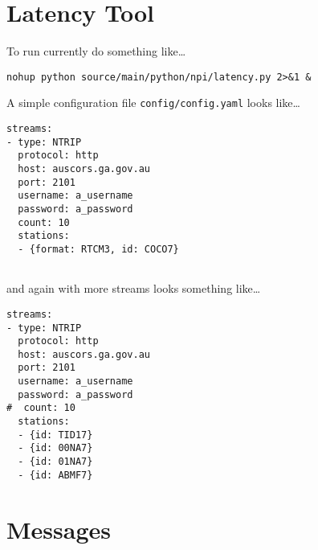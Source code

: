\section{Latency Tool}\label{latency-tool}

To run currently do something like\ldots{}

\begin{verbatim}
nohup python source/main/python/npi/latency.py 2>&1 & 
\end{verbatim}

A simple configuration file \texttt{config/config.yaml} looks
like\ldots{}

\begin{verbatim}
streams:
- type: NTRIP
  protocol: http
  host: auscors.ga.gov.au
  port: 2101
  username: a_username
  password: a_password
  count: 10
  stations:
  - {format: RTCM3, id: COCO7}
 
\end{verbatim}

and again with more streams looks something like\ldots{}

\begin{verbatim}
streams:
- type: NTRIP
  protocol: http
  host: auscors.ga.gov.au
  port: 2101
  username: a_username
  password: a_password
#  count: 10
  stations:
  - {id: TID17}
  - {id: 00NA7}
  - {id: 01NA7}
  - {id: ABMF7}

\end{verbatim}


\section{Messages}\label{messages}


